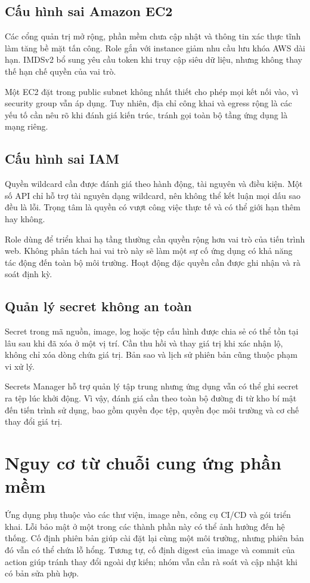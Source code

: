 \subsection{Cấu hình sai Amazon EC2}
Các cổng quản trị mở rộng, phần mềm chưa cập nhật và thông tin xác thực tĩnh làm tăng bề mặt tấn công. Role gắn với instance giảm nhu cầu lưu khóa AWS dài hạn. IMDSv2 bổ sung yêu cầu token khi truy cập siêu dữ liệu, nhưng không thay thế hạn chế quyền của vai trò.

Một EC2 đặt trong public subnet không nhất thiết cho phép mọi kết nối vào, vì security group vẫn áp dụng. Tuy nhiên, địa chỉ công khai và egress rộng là các yếu tố cần nêu rõ khi đánh giá kiến trúc, tránh gọi toàn bộ tầng ứng dụng là mạng riêng.
\subsection{Cấu hình sai IAM}
Quyền wildcard cần được đánh giá theo hành động, tài nguyên và điều kiện. Một số API chỉ hỗ trợ tài nguyên dạng wildcard, nên không thể kết luận mọi dấu sao đều là lỗi. Trọng tâm là quyền có vượt công việc thực tế và có thể giới hạn thêm hay không.

Role dùng để triển khai hạ tầng thường cần quyền rộng hơn vai trò của tiến trình web. Không phân tách hai vai trò này sẽ làm một sự cố ứng dụng có khả năng tác động đến toàn bộ môi trường. Hoạt động đặc quyền cần được ghi nhận và rà soát định kỳ.
\subsection{Quản lý secret không an toàn}
Secret trong mã nguồn, image, log hoặc tệp cấu hình được chia sẻ có thể tồn tại lâu sau khi đã xóa ở một vị trí. Cần thu hồi và thay giá trị khi xác nhận lộ, không chỉ xóa dòng chứa giá trị. Bản sao và lịch sử phiên bản cũng thuộc phạm vi xử lý.

Secrets Manager hỗ trợ quản lý tập trung nhưng ứng dụng vẫn có thể ghi secret ra tệp lúc khởi động. Vì vậy, đánh giá cần theo toàn bộ đường đi từ kho bí mật đến tiến trình sử dụng, bao gồm quyền đọc tệp, quyền đọc môi trường và cơ chế thay đổi giá trị.

\section{Nguy cơ từ chuỗi cung ứng phần mềm}
Ứng dụng phụ thuộc vào các thư viện, image nền, công cụ CI/CD và gói triển khai. Lỗi bảo mật ở một trong các thành phần này có thể ảnh hưởng đến hệ thống. Cố định phiên bản giúp cài đặt lại cùng một môi trường, nhưng phiên bản đó vẫn có thể chứa lỗ hổng. Tương tự, cố định digest của image và commit của action giúp tránh thay đổi ngoài dự kiến; nhóm vẫn cần rà soát và cập nhật khi có bản sửa phù hợp.

